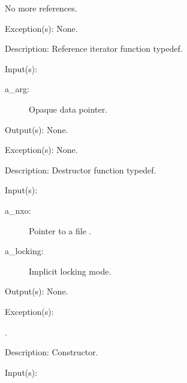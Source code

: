 \begin{capi}
\begin{capilist}
\begin{description}
\begin{description}
				No more references.
			\end{description}
		\end{description}
	\item[Exception(s): ] None.
	\item[Description: ]
		Reference iterator function typedef.
	\end{capilist}
\label{cw_nxo_file_delete_t}
	\begin{capilist}
	\item[Input(s): ]
		\begin{description}\item[]
		\item[a\_arg: ]
			Opaque data pointer.
		\end{description}
	\item[Output(s): ] None.
	\item[Exception(s): ] None.
	\item[Description: ]
		Destructor function typedef.
	\end{capilist}
\label{nxo_file_new}
	\begin{capilist}
	\item[Input(s): ]
		\begin{description}\item[]
		\item[a\_nxo: ]
			Pointer to a file .
		\item[a\_locking: ]
			Implicit locking mode.
		\end{description}
	\item[Output(s): ] None.
	\item[Exception(s): ]
		\begin{description}\item[]
		\item[.]
		\end{description}
	\item[Description: ]
		Constructor.
	\end{capilist}
\label{nxo_file_fd_wrap}
	\begin{capilist}
	\item[Input(s): ]

\end{capilist}
\end{capi}
